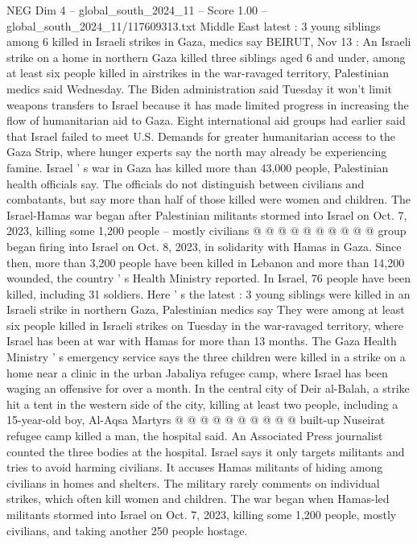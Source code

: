 \begin{textsample}{NEG Dim 4 – global\_south\_2024\_11 – Score 1.00 – global\_south\_2024\_11/117609313.txt}  \label{ex:f4_neg_178}
Middle East latest : 3 young siblings among 6 killed in Israeli strikes in Gaza, medics say BEIRUT, Nov 13 : An Israeli strike on a home in northern Gaza killed three siblings aged 6 and under, among at least six people killed in airstrikes in the war-ravaged territory, Palestinian medics said Wednesday.
The Biden administration said Tuesday it won't limit weapons transfers to Israel because it has made limited progress in increasing the flow of humanitarian aid to Gaza.
Eight international aid groups had earlier said that Israel failed to meet U.S.
Demands for greater humanitarian access to the Gaza Strip, where hunger experts say the north may already be experiencing famine.
Israel ' s war in Gaza has killed more than 43,000 people, Palestinian health officials say.
The officials do not distinguish between civilians and combatants, but say more than half of those killed were women and children.
The Israel-Hamas war began after Palestinian militants stormed into Israel on Oct. 7, 2023, killing some 1,200 people -- mostly civilians @ @ @ @ @ @ @ @ @ @ group began firing into Israel on Oct. 8, 2023, in solidarity with Hamas in Gaza.
Since then, more than 3,200 people have been killed in Lebanon and more than 14,200 wounded, the country ' s Health Ministry reported.
In Israel, 76 people have been killed, including 31 soldiers.
Here ' s the latest : 3 young siblings were killed in an Israeli strike in northern Gaza, Palestinian medics say They were among at least six people killed in Israeli strikes on Tuesday in the war-ravaged territory, where Israel has been at war with Hamas for more than 13 months.
The Gaza Health Ministry ' s emergency service says the three children were killed in a strike on a home near a clinic in the urban Jabaliya refugee camp, where Israel has been waging an offensive for over a month.
In the central city of Deir al-Balah, a strike hit a tent in the western side of the city, killing at least two people, including a 15-year-old boy, Al-Aqsa Martyrs @ @ @ @ @ @ @ @ @ @ built-up Nuseirat refugee camp killed a man, the hospital said.
An Associated Press journalist counted the three bodies at the hospital.
Israel says it only targets militants and tries to avoid harming civilians.
It accuses Hamas militants of hiding among civilians in homes and shelters.
The military rarely comments on individual strikes, which often kill women and children.
The war began when Hamas-led militants stormed into Israel on Oct. 7, 2023, killing some 1,200 people, mostly civilians, and taking another 250 people hostage.

\end{textsample}
